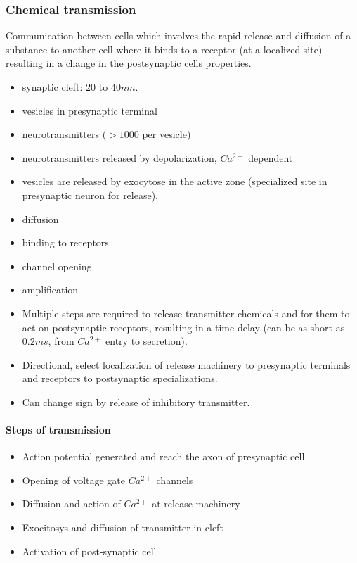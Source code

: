 \documentclass[main]{subfiles}
\begin{document}
\subsubsection{Chemical transmission}
Communication between cells which involves the rapid release and diffusion of a substance to another cell where it binds to a receptor (at a localized site) resulting in a change in the postsynaptic cells properties.

\begin{itemize}
\item synaptic cleft: $20$ to $40nm$.
\item vesicles in presynaptic terminal
\item neurotransmitters ($>1000$ per vesicle)
\item neurotransmitters released by depolarization, $Ca^{2+}$ dependent
\item vesicles are released by exocytose in the active zone (specialized site in presynaptic neuron for release).
\item diffusion
\item binding to receptors
\item channel opening
\item amplification
\item Multiple steps are required to release transmitter chemicals and for them to act on postsynaptic receptors, resulting in a time delay (can be as short as $0.2 ms$, from $Ca^{2+}$ entry to secretion).
\item Directional, select localization of release machinery to presynaptic terminals and receptors to postsynaptic specializations. 
\item Can change sign by release of inhibitory transmitter.
\end{itemize}

\paragraph{Steps of transmission}
\begin{itemize}
\item Action potential generated and reach the axon of presynaptic cell
\item Opening of voltage gate $Ca^{2+}$ channels
\item Diffusion and action of $Ca^{2+}$ at release machinery
\item Exocitosys and diffusion of transmitter in cleft
\item Activation of post-synaptic cell
\end{itemize}
\end{document}
